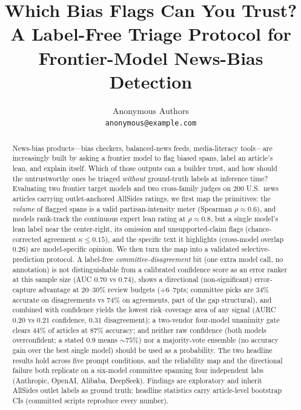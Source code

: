 \documentclass{article}
\title{Which Bias Flags Can You Trust?\\
A Label-Free Triage Protocol for\\
Frontier-Model News-Bias Detection}
\author{Anonymous Authors\\
\texttt{anonymous@example.com}}
\newcommand{\kap}{\kappa}
\begin{document}
\maketitle

\begin{abstract}
News-bias products---bias checkers, balanced-news feeds, media-literacy
tools---are increasingly built by asking a frontier model to flag biased
spans, label an article's lean, and explain itself. Which of those
outputs can a builder trust, and how should the untrustworthy ones be
triaged \emph{without} ground-truth labels at inference time? Evaluating
two frontier target models and two cross-family judges on 200 U.S.\
news articles carrying outlet-anchored AllSides ratings, we first map the primitives: the
\emph{volume} of flagged spans is a valid partisan-intensity meter
(Spearman $\rho \approx 0.6$), and models rank-track the continuous
expert lean rating at $\rho \approx 0.8$, but a single model's lean
label near the center-right, its omission and unsupported-claim flags
(chance-corrected agreement $\kap \le 0.15$), and the specific text it highlights
(cross-model overlap $0.26$) are model-specific opinion. We then turn the
map into a validated selective-prediction protocol. A label-free
\emph{committee-disagreement} bit (one extra model call, no annotation)
is not distinguishable from a calibrated confidence score as an error
ranker at this sample size (AUC $0.70$ vs $0.74$), shows a directional
(non-significant) error-capture advantage at $20$--$30\%$ review
budgets ($+6$--$7$pts; committee picks are $34\%$ accurate on
disagreements vs $74\%$ on agreements, part of the gap structural), and
combined with confidence yields the lowest risk--coverage area of any
signal (AURC $0.20$ vs $0.21$ confidence, $0.31$ disagreement); a
two-vendor four-model unanimity gate clears $44\%$ of articles at
$87\%$ accuracy; and neither raw confidence (both models overconfident; a stated
$0.9$ means ${\sim}75\%$) nor a majority-vote ensemble (no accuracy gain
over the best single model) should be used as a probability. The two headline results hold across five prompt conditions, and the
reliability map and the directional failure both replicate on a six-model committee spanning
four independent labs (Anthropic, OpenAI, Alibaba, DeepSeek). Findings
are exploratory and inherit AllSides outlet labels as ground truth;
headline statistics carry article-level bootstrap CIs (committed
scripts reproduce every number).
\end{abstract}
\end{document}

